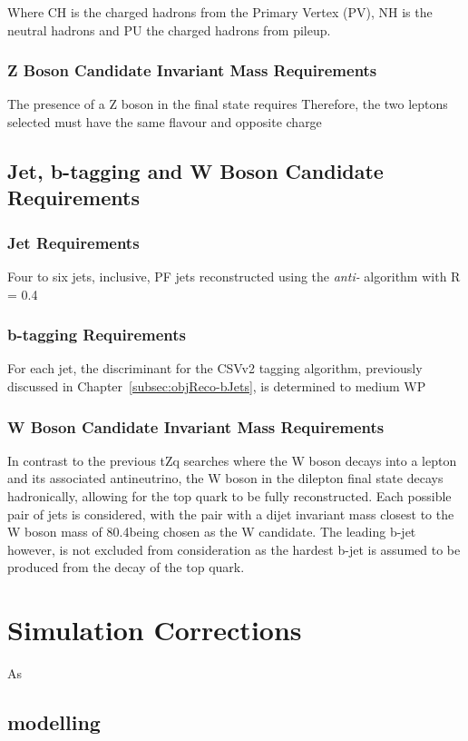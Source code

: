 Where CH is the charged hadrons from the Primary Vertex (PV), NH is the neutral hadrons and PU the charged hadrons from pileup.
\subsubsection{Z Boson Candidate Invariant Mass Requirements}
The presence of a Z boson in the final state requires  
Therefore, the two leptons selected must have the same flavour and opposite charge
\subsection{Jet, b-tagging and W Boson Candidate Requirements}
\subsubsection{Jet Requirements}
Four to six jets, inclusive, 
PF jets reconstructed using the \emph{anti-\kt} algorithm with R = 0.4

\subsubsection{b-tagging Requirements}
For each jet, the discriminant for the CSVv2 tagging algorithm, previously discussed in Chapter~\ref{subsec:objReco-bJets}, is determined to medium WP

\subsubsection{W Boson Candidate Invariant Mass Requirements}
In contrast to the previous tZq searches where the W boson decays into a lepton and its associated antineutrino, the W boson in the dilepton final state decays hadronically, allowing for the top quark to be fully reconstructed.
Each possible pair of jets is considered, with the pair with a dijet invariant mass closest to the W boson mass of 80.4\GeVcc being chosen as the W candidate.
The leading b-jet however, is not excluded from consideration as the hardest b-jet is assumed to be produced from the decay of the top quark. 

\section{Simulation Corrections}\label{sec:simCorrections}
As 
\subsection{\PU modelling}

